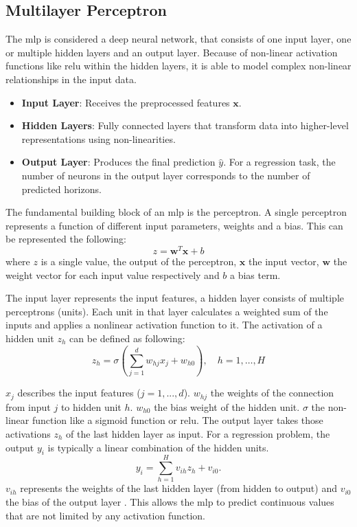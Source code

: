 \documentclass[12pt,twoside=false,a4paper,parskip]{scrbook}
\begin{document}
\subsection{Multilayer Perceptron}
The \gls{mlp} is considered a deep neural network, that consists of one input layer, one or multiple hidden layers and an output layer. 
Because of non-linear activation functions like \gls{relu} within the hidden layers, it is able to model complex non-linear relationships in the input data. 

\begin{itemize}
\item \textbf{Input Layer}: Receives the preprocessed features $\mathbf{x}$.
\item \textbf{Hidden Layers}: Fully connected layers that transform data into higher-level representations using non-linearities.
\item \textbf{Output Layer}: Produces the final prediction $\hat{y}$. For a regression task, the number of neurons in the output layer corresponds to the number of predicted horizons.
\end{itemize}
The fundamental building block of an \gls{mlp} is the perceptron. A single perceptron represents a function of different input parameters, weights and a bias. This can be represented the following: 
\begin{equation}
    z = \mathbf{w}^T \mathbf{x} + b
\end{equation}
where $z$ is a single value, the output of the perceptron, $\mathbf{x}$ the input vector, $\mathbf{w}$ the weight vector for each input value respectively and $b$ a bias term.

The input layer represents the input features, a hidden layer consists of multiple perceptrons (units). Each unit in that layer calculates a weighted sum of the inputs and applies a nonlinear activation function to it. The activation of a hidden unit $z_h$ can be defined as following:
\begin{equation}
    z_h = \sigma \left( \sum_{j=1}^{d} w_{hj} x_j + w_{h0} \right), \quad h = 1, \dots, H
\end{equation}

  $x_j$ describes the input features ($j=1, ..., d$). $w_{hj}$ the weights of the connection from input $j$ to hidden unit $h$. $w_{h0}$ the bias weight of the hidden unit. $\sigma$ the non-linear function like a sigmoid function or \gls{relu}. The output layer takes those activations $z_h$ of the last hidden layer as input. For a regression problem, the output $y_i$ is typically a linear combination of the hidden units. 
  \begin{equation}
      y_i = \sum_{h=1}^{H} v_{ih} z_h + v_{i0}.
  \end{equation}
  $v_{ih}$ represents the weights of the last hidden layer (from hidden to output) and $v_{i0}$ the bias of the output layer \cite[pp. 298-299]{Alpaydin2022}. This allows the \gls{mlp} to predict continuous values that are not limited by any activation function.
\end{document}

